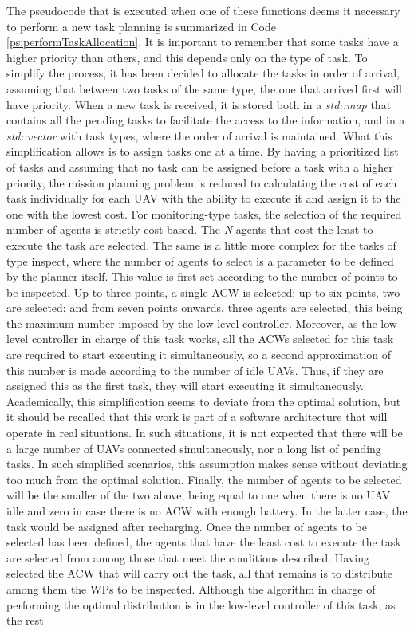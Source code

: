 The pseudocode that is executed when one of these functions deems it necessary to perform a new task planning is summarized in Code \ref{ps:performTaskAllocation}. It is important to remember that some tasks have a higher priority than others, and this depends only on the type of task. To simplify the process, it has been decided to allocate the tasks in order of arrival, assuming that between two tasks of the same type, the one that arrived first will have priority. When a new task is received, it is stored both in a \emph{std::map} that contains all the pending tasks to facilitate the access to the information, and in a \emph{std::vector} with task types, where the order of arrival is maintained. What this simplification allows is to assign tasks one at a time. By having a prioritized list of tasks and assuming that no task can be assigned before a task with a higher priority, the mission planning problem is reduced to calculating the cost of each task individually for each \gls{UAV} with the ability to execute it and assign it to the one with the lowest cost. For monitoring-type tasks, the selection of the required number of agents is strictly cost-based. The \emph{N} agents that cost the least to execute the task are selected. The same is a little more complex for the tasks of type inspect, where the number of agents to select is a parameter to be defined by the planner itself. This value is first set according to the number of points to be inspected. Up to three points, a single \gls{ACW} is selected; up to six points, two are selected; and from seven points onwards, three agents are selected, this being the maximum number imposed by the low-level controller. Moreover, as the low-level controller in charge of this task works, all the \glspl{ACW} selected for this task are required to start executing it simultaneously, so a second approximation of this number is made according to the number of idle \glspl{UAV}. Thus, if they are assigned this as the first task, they will start executing it simultaneously. Academically, this simplification seems to deviate from the optimal solution, but it should be recalled that this work is part of a software architecture that will operate in real situations. In such situations, it is not expected that there will be a large number of \glspl{UAV} connected simultaneously, nor a long list of pending tasks. In such simplified scenarios, this assumption makes sense without deviating too much from the optimal solution. Finally, the number of agents to be selected will be the smaller of the two above, being equal to one when there is no \gls{UAV} idle and zero in case there is no \gls{ACW} with enough battery. In the latter case, the task would be assigned after recharging. Once the number of agents to be selected has been defined, the agents that have the least cost to execute the task are selected from among those that meet the conditions described. Having selected the \gls{ACW} that will carry out the task, all that remains is to distribute among them the \glspl{WP} to be inspected. Although the algorithm in charge of performing the optimal distribution is in the low-level controller of this task, as the rest 